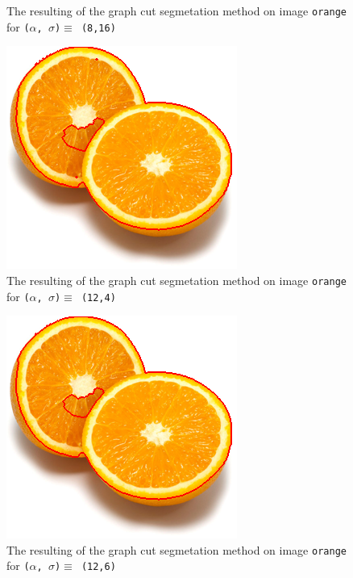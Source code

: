 {\begin{minipage}{0.45\linewidth}
\begin{figure}[H]
      \caption{The resulting of the graph cut segmetation method on image \texttt{orange} for
        \texttt{($\alpha$, $\sigma$)$ \equiv$ (8,16)}}
      \label{fig:04_orange2_a8_s16}
    \end{figure}
  \end{minipage}

  \begin{minipage}{0.45\linewidth}
    \begin{figure}[H]
      \includegraphics[scale=0.5]{./images/04/Q11/var_a_b/orange/graphcut2_a12_s4.png}
      \caption{The resulting of the graph cut segmetation method on image \texttt{orange} for
        \texttt{($\alpha$, $\sigma$)$ \equiv$ (12,4)}}
      \label{fig:04_orange2_a12_s4}
    \end{figure}
    \vfill
    \begin{figure}[H]
      \includegraphics[scale=0.5]{./images/04/Q11/var_a_b/orange/graphcut2_a12_s6.png}
      \caption{The resulting of the graph cut segmetation method on image \texttt{orange} for
        \texttt{($\alpha$, $\sigma$)$ \equiv$ (12,6)}}
      \label{fig:04_orange2_a12_s6}
    \end{figure}

\end{minipage}}
